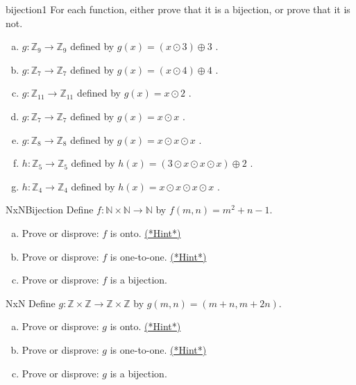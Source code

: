 \begin{exercise}{bijection1} 
For each function, either prove that it is a bijection, or prove that it is not.
\begin{enumerate}[(a)]
\item \label{modular9}
 $g \colon {\mathbb Z}_9 \to {\mathbb Z}_9$ defined by $g(x)= (x \odot 3) \oplus 3$ .
\item \label{modular_m6}
 $g \colon {\mathbb Z}_7 \to {\mathbb Z}_7$ defined by $g(x) = (x \odot 4) \oplus 4 $ .
\item \label{modular_m7}
 $g \colon {\mathbb Z}_{11} \to {\mathbb Z}_{11}$ defined by $g(x) =  x \odot 2$ .
\item 
 $g \colon {\mathbb Z}_7 \to {\mathbb Z}_7$ defined by $g(x)= x \odot x$ .
\item 
 $g \colon {\mathbb Z}_8 \to {\mathbb Z}_8$ defined by $g(x)= x \odot x \odot x$ .
\item 
 $h \colon {\mathbb Z}_5 \to {\mathbb Z}_5$ defined by $h(x)= (3 \odot x \odot x \odot x) \oplus 2$ .
\item 
 $h \colon {\mathbb Z}_4 \to {\mathbb Z}_4$ defined by $h(x)= x \odot x \odot x \odot x$ .

 \end{enumerate}
\end{exercise}


 
 \begin{exercise}{NxNBijection} 
 Define $f \colon \mathbb{N} \times \mathbb{N} \to \mathbb{N}$ by $f(m,n) = m^2 + n - 1$. 
 \begin{enumerate}[(a)]
 \item \label{NxNBijection-m2+n-onto}  
 Prove or disprove: $f$ is onto.
 \hyperref[sec:functions:hints]{(*Hint*)}
 \item \label{NxNBijection-m2+n-not11}  
Prove or disprove: $f$ is one-to-one.
 \hyperref[sec:functions:hints]{(*Hint*)}
\item
Prove or disprove:  $f$ is a bijection.
 \end{enumerate}
\end{exercise}

\begin{exercise}{NxN}
Define $g \colon \mathbb{Z} \times \mathbb{Z} \to \mathbb{Z} \times \mathbb{Z}$ by $g(m,n) = (m + n, m + 2n)$. 
 \begin{enumerate}[(a)]
 \item  \label{NxNBijection-mpmn-notonto1}  
Prove or disprove: $g$ is onto.
\hyperref[sec:functions:hints]{(*Hint*)} 
 \item  \label{NxNBijection-mpmn-111}  
Prove or disprove: $g$ is one-to-one.
\hyperref[sec:functions:hints]{(*Hint*)}
\item
Prove or disprove: $g$ is a bijection.
 \end{enumerate}
\end{exercise}

